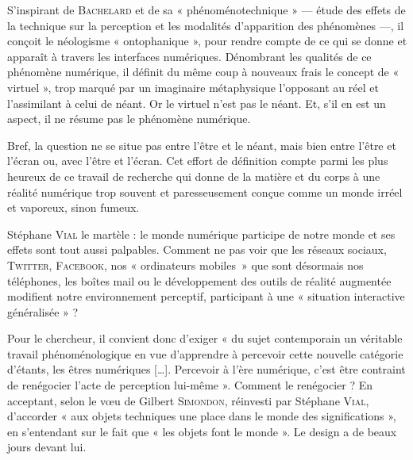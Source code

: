 S’inspirant de \textsc{Bachelard} et de sa « phénoménotechnique » --- étude des effets de la technique sur la perception et les modalités d’apparition des phénomènes ---, il conçoit le néologisme « ontophanique », pour rendre compte de ce qui se donne et apparaît à travers les interfaces numériques. Dénombrant les qualités de ce phénomène numérique, il définit du même coup à nouveaux frais le concept de « virtuel », trop marqué par un imaginaire métaphysique l’opposant au réel et l’assimilant à celui de néant. Or le virtuel n’est pas le néant. Et, s’il en est un aspect, il ne résume pas le phénomène numérique.

Bref, la question ne se situe pas entre l’être et le néant, mais bien entre l’être et l’écran ou, avec l’être et l’écran. Cet effort de définition compte parmi les plus heureux de ce travail de recherche qui donne de la matière et du corps à une réalité numérique trop souvent et paresseusement conçue comme un monde irréel et vaporeux, sinon fumeux.


Stéphane \textsc{Vial} le martèle : le monde numérique participe de notre monde et ses effets sont tout aussi palpables. Comment ne pas voir que les réseaux sociaux, \textsc{Twitter}, \textsc{Facebook}, nos « ordinateurs mobiles~» que sont désormais nos téléphones, les boîtes mail ou le développement des outils de réalité augmentée modifient notre environnement perceptif, participant à une « situation interactive généralisée » ?

Pour le chercheur, il convient donc d’exiger « du sujet contemporain un véritable travail phénoménologique en vue d’apprendre à percevoir cette nouvelle catégorie d’étants, les êtres numériques […]. Percevoir à l’ère numérique, c’est être contraint de renégocier l’acte de perception lui-même ».
Comment le renégocier ? En acceptant, selon le vœu de Gilbert \textsc{Simondon}, réinvesti par Stéphane \textsc{Vial}, d'accorder « aux objets techniques une place dans le monde des significations », en s'entendant sur le fait que « les objets font le monde ». Le design a de beaux jours devant lui.

